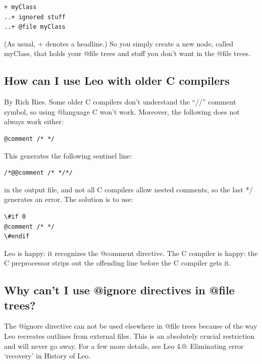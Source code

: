 \documentclass[a4paper,10pt,english]{sphinxmanual}
\begin{document}
\begin{Verbatim}[commandchars=\\\{\}]
+ myClass
..+ ignored stuff
..+ @file myClass
\end{Verbatim}

(As usual, + denotes a headline.) So you simply create a new node, called
myClass, that holds your @file trees and stuff you don't want in the @file
trees.


\subsection{How can I use Leo with older C compilers}
\label{FAQ:how-can-i-use-leo-with-older-c-compilers}
By Rich Ries.
Some older C compilers don't understand the ``//'' comment symbol, so using @language C won't work.
Moreover, the following does not always work either:

\begin{Verbatim}[commandchars=\\\{\}]
@comment /* */
\end{Verbatim}

This generates the following sentinel line:

\begin{Verbatim}[commandchars=\\\{\}]
/*@@comment /* */*/
\end{Verbatim}

in the output file, and not all C compilers allow nested comments, so the last */ generates an error.
The solution is to use:

\begin{Verbatim}[commandchars=\\\{\}]
\#if 0
@comment /* */
\#endif
\end{Verbatim}

Leo is happy: it recognizes the @comment directive.
The C compiler is happy: the C preprocessor strips out the offending line before the C
compiler gets it.


\subsection{Why can't I use @ignore directives in @file trees?}
\label{FAQ:why-can-t-i-use-ignore-directives-in-file-trees}
The @ignore directive can not be used elsewhere in @file trees because of the way Leo recreates
outlines from external files. This is an absolutely crucial restriction and will never go away.
For a few more details, see Leo 4.0: Eliminating error `recovery' in History of Leo.
\end{document}

